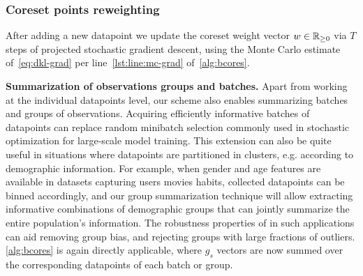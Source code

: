 \subsubsection{Coreset points reweighting}
After adding a new datapoint we update the coreset weight vector $w\in\mathbb{R}_{\geq 0}$ via $T$ steps of projected stochastic gradient descent, using the Monte Carlo estimate of~\cref{eq:dkl-grad} per line~\ref{lst:line:mc-grad} of~\cref{alg:bcores}.
\begin{comment}
\[
\hat{\nabla}_w := -\frac{1}{S} \sum_{s=1}^{S} g_s \left(\frac{N}{B}1^Tg_s - w^T g_s\right) \in \reals_{d}, 
\label{eq:gradw}
\]
where $g_s$ are defined as in~\cref{eq:sampled-potentials}.
\end{comment}
\vspace{.2cm}
\par 
\textbf{Summarization of observations groups and batches.}
Apart from working at the individual datapoints level, our scheme also enables summarizing batches and groups of observations. Acquiring efficiently informative batches of datapoints can replace random minibatch selection commonly used in stochastic optimization for large-scale model training. This extension can also be quite useful in situations where datapoints are partitioned in clusters, e.g. according to demographic information. For example, when gender and age features are available in datasets capturing users movies habits, collected datapoints can be binned accordingly, and our group summarization technique will allow extracting informative combinations of demographic groups that can jointly summarize the entire population's information. The robustness properties of \bcores{} in such applications can aid removing group bias, and rejecting groups with large fractions of outliers. \cref{alg:bcores} is again directly applicable, where $g_s$ vectors are now summed over the corresponding datapoints of each batch or group.
